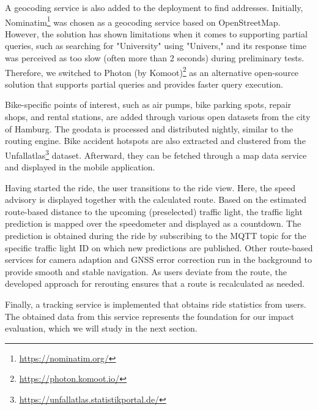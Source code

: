 A geocoding service is also added to the deployment to find addresses. Initially, Nominatim\footnote{\url{https://nominatim.org/}} was chosen as a geocoding service based on OpenStreetMap. However, the solution has shown limitations when it comes to supporting partial queries, such as searching for "University" using "Univers," and its response time was perceived as too slow (often more than 2 seconds) during preliminary tests. Therefore, we switched to Photon (by Komoot)\footnote{\url{https://photon.komoot.io/}} as an alternative open-source solution that supports partial queries and provides faster query execution.

Bike-specific points of interest, such as air pumps, bike parking spots, repair shops, and rental stations, are added through various open datasets from the city of Hamburg. The geodata is processed and distributed nightly, similar to the routing engine. Bike accident hotspots are also extracted and clustered from the Unfallatlas\footnote{\url{https://unfallatlas.statistikportal.de/}} dataset. Afterward, they can be fetched through a map data service and displayed in the mobile application.

Having started the ride, the user transitions to the ride view. Here, the speed advisory is displayed together with the calculated route. Based on the estimated route-based distance to the upcoming (preselected) traffic light, the traffic light prediction is mapped over the speedometer and displayed as a countdown. The prediction is obtained during the ride by subscribing to the MQTT topic for the specific traffic light ID on which new predictions are published. Other route-based services for camera adaption and GNSS error correction run in the background to provide smooth and stable navigation. As users deviate from the route, the developed approach for rerouting ensures that a route is recalculated as needed. 

Finally, a tracking service is implemented that obtains ride statistics from users. The obtained data from this service represents the foundation for our impact evaluation, which we will study in the next section.


